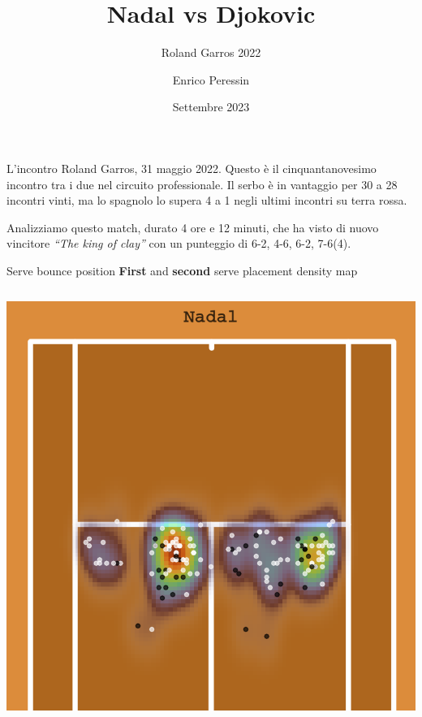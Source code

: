 \documentclass[
  ignorenonframetext,
]{beamer}
\title{Nadal vs Djokovic}
\subtitle{Roland Garros 2022}
\author{Enrico Peressin}
\date{Settembre 2023}
\begin{document}
\frame{\titlepage}

\begin{frame}{L'incontro}
\protect\hypertarget{lincontro}{}
Roland Garros, 31 maggio 2022. Questo è il cinquantanovesimo incontro
tra i due nel circuito professionale. Il serbo è in vantaggio per 30 a
28 incontri vinti, ma lo spagnolo lo supera 4 a 1 negli ultimi incontri
su terra rossa.

Analizziamo questo match, durato 4 ore e 12 minuti, che ha visto di
nuovo vincitore \emph{``The king of clay''} con un punteggio di 6-2,
4-6, 6-2, 7-6(4).
\end{frame}

\begin{frame}{Serve bounce position}
\protect\hypertarget{serve-bounce-position}{}
{\textbf{First}} and { \textbf{second} } serve placement density map

\begin{column}{0.48\textwidth}
\includegraphics{presentationtest1+_files/figure-beamer/Nadal Serve-1.pdf}
\end{column}


\end{frame}
\end{document}
